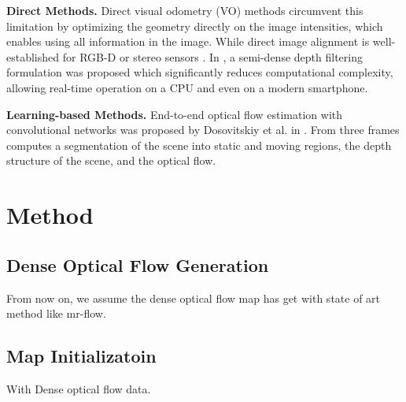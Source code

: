 \documentclass{article}
\begin{document}
\textbf{Direct Methods.} Direct visual odometry (VO) methods circumvent this limitation by optimizing the geometry directly on the image intensities, which enables using all information in the image. While direct image alignment is well-established for RGB-D or stereo sensors \cite{Kerl2014Dense} \cite{Comport2016Accurate}. In \cite{Engel2014LSD}, a semi-dense depth filtering formulation was proposed which significantly reduces computational complexity, allowing real-time operation on a CPU and even on a modern smartphone.

\textbf{Learning-based Methods.} End-to-end optical flow estimation with convolutional networks was proposed by Dosovitskiy et al. in \cite{Ilg2016FlowNet}. \cite{Wulff2017Optical} From three frames computes a segmentation of the scene into static and moving regions, the depth structure of the scene, and the optical flow.

\section{Method}

\subsection{Dense Optical Flow Generation}

From now on, we assume the dense optical flow map has get with state of art method like mr-flow.

\subsection{Map Initializatoin}

With Dense optical flow data.



\end{document}

